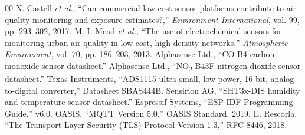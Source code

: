 \documentclass[conference]{IEEEtran}
\begin{document}
\begin{thebibliography}{00}
 N. Castell \textit{et al.}, ``Can commercial low-cost sensor platforms contribute to air quality monitoring and exposure estimates?,'' \textit{Environment International}, vol. 99, pp. 293--302, 2017.
 M. I. Mead \textit{et al.}, ``The use of electrochemical sensors for monitoring urban air quality in low-cost, high-density networks,'' \textit{Atmospheric Environment}, vol. 70, pp. 186--203, 2013.
 Alphasense Ltd., ``CO-B4 carbon monoxide sensor datasheet.''
 Alphasense Ltd., ``NO\textsubscript{2}-B43F nitrogen dioxide sensor datasheet.''
 Texas Instruments, ``ADS1115 ultra-small, low-power, 16-bit, analog-to-digital converter,'' Datasheet SBAS444B.
 Sensirion AG, ``SHT3x-DIS humidity and temperature sensor datasheet.''
 Espressif Systems, ``ESP-IDF Programming Guide,'' v6.0.
 OASIS, ``MQTT Version 5.0,'' OASIS Standard, 2019.
 E. Rescorla, ``The Transport Layer Security (TLS) Protocol Version 1.3,'' RFC 8446, 2018.
\end{thebibliography}
\end{document}
